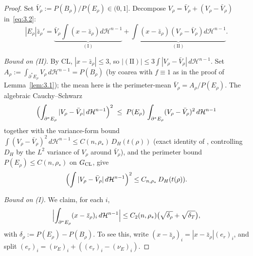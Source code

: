 \documentclass[11pt]{article}
\theoremstyle{definition}
\newcommand{\rstar}{\rho_{*}}
\newcommand{\zbar}{\bar z_{\rho}}
\begin{document}
\begin{proof}
Set $\bar V_\rho:=P(B_\rho)/P(E_\rho)\in(0,1]$. Decompose
$V_\rho=\bar V_\rho+(V_\rho-\bar V_\rho)$ in~\eqref{eq:3.2}:
\begin{equation}\label{eq:4.2}
   |E_\rho|\bar z_\rho'
   =\underbrace{\bar V_\rho\!\int(x-\zbar)d\mathcal H^{n-1}}_{(\mathrm I)}
   +\underbrace{\int(x-\zbar)(V_\rho-\bar V_\rho)d\mathcal H^{n-1}}_{(\mathrm{II})}.
\end{equation}

\emph{Bound on (II).} By CL, $|x-\zbar|\le 3$, so
$|(\mathrm{II})|\le 3\int|V_\rho-\bar V_\rho|\,d\mathcal H^{n-1}$.
Set $A_\rho:=\int_{\partial^*E_\rho}V_\rho\,d\mathcal H^{n-1}=P(B_\rho)$
(by coarea with $f\equiv 1$ as in the proof of Lemma~\ref{lem:3.1});
the mean here is the perimeter-mean
$\bar V_\rho=A_\rho/P(E_\rho)$. The algebraic Cauchy--Schwarz
\[
   \Bigl(\int_{\partial^*E_\rho}|V_\rho-\bar V_\rho|\,d\mathcal H^{n-1}\Bigr)^2
   \;\le\; P(E_\rho)\,
     \int_{\partial^*E_\rho}(V_\rho-\bar V_\rho)^2\,d\mathcal H^{n-1}
\]
together with the variance-form bound
$\int(V_\rho-\bar V_\rho)^2\,d\mathcal H^{n-1}\le C(n,\rstar)\,D_H(t(\rho))$
(exact identity of \cite{LevelSetIdentity}, controlling $D_H$ by the
$L^2$ variance of $V_\rho$ around $\bar V_\rho$), and the perimeter
bound $P(E_\rho)\le C(n,\rstar)$ on $G_{\rm CL}$, give
\begin{equation}\label{eq:4.3}
   \Bigl(\int|V_\rho-\bar V_\rho|\,d\mathcal H^{n-1}\Bigr)^2
   \le C_{n,\rstar}\,D_H(t(\rho)).
\end{equation}

\emph{Bound on (I).} We claim, for each $i$,
\begin{equation}\label{eq:4.4}
   \Bigl|\int_{\partial^*E_\rho}(x-\zbar)_i\,d\mathcal H^{n-1}\Bigr|
   \le C_2(n,\rstar)\bigl(\sqrt{\delta_\rho}+\sqrt{\delta_T}\bigr),
\end{equation}
with $\delta_\rho:=P(E_\rho)-P(B_\rho)$. To see this, write
$(x-\zbar)_i=|x-\zbar|(e_r)_i$, and split
$(e_r)_i=(\nu_E)_i+((e_r)_i-(\nu_E)_i)$.


\end{proof}
\end{document}
